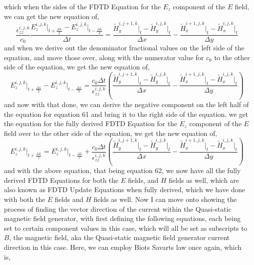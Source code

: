 \documentclass[]{article}
\begin{document}
which when the sides of the FDTD Equation for the $E_z$ component of the $E$ field, we can get the new equation of,
\begin{equation}
\frac{\epsilon_{zz}^{i,j,k}}{c_0} \frac{{E}_{z}^{i,j,k}\Big|_{t+\frac{\Delta{L}}{2}} -E_{z}^{i,j,k}\Big|_{t - \frac{\Delta{L}}{2}}}{\Delta{t}} = \frac{\tilde{H}_{y}^{i, j + 1 , k} \Big|_t - \tilde{H}_{y}^{i,j,k}\Big|_t}{\Delta{x}} - \frac{\tilde{H}_{x}^{i + 1, j, k} \Big|_t - \tilde{H}_{x}^{i,j,k}\Big|_t}{\Delta{y}}
\end{equation}
and when we derive out the denominator fractional values on the left side of the equation, and move those over, along with the numerator value for $c_0$ to the other side of the equation, we get the new equation of,
\begin{equation}
{E}_{z}^{i,j,k}\Big|_{t+\frac{\Delta{L}}{2}} -E_{z}^{i,j,k}\Big|_{t - \frac{\Delta{L}}{2}} = \frac{c_0\Delta{t}}{\epsilon_{zz}^{i,j,k}} \left(\frac{\tilde{H}_{y}^{i, j + 1 , k} \Big|_t - \tilde{H}_{y}^{i,j,k}\Big|_t}{\Delta{x}} - \frac{\tilde{H}_{x}^{i + 1, j, k} \Big|_t - \tilde{H}_{x}^{i,j,k}\Big|_t}{\Delta{y}}\right)
\end{equation}
and now with that done, we can derive the negative component on the left half of the equation for equation 61 and bring it to the right side of the equation, we get the equation for the fully derived FDTD Equation for the $E_z$ component of the $E$ field over to the other side of the equation, we get the new equation of,
\begin{equation}
{E}_{z}^{i,j,k}\Big|_{t+\frac{\Delta{L}}{2}} = E_{z}^{i,j,k}\Big|_{t - \frac{\Delta{L}}{2}} + \frac{c_0\Delta{t}}{\epsilon_{zz}^{i,j,k}} \left(\frac{\tilde{H}_{y}^{i, j + 1 , k} \Big|_t - \tilde{H}_{y}^{i,j,k}\Big|_t}{\Delta{x}} - \frac{\tilde{H}_{x}^{i + 1, j, k} \Big|_t - \tilde{H}_{x}^{i,j,k}\Big|_t}{\Delta{y}}\right)
\end{equation}
and with the above equation, that being equation 62, we now have all the fully derived FDTD Equations for both the $E$ fields, and $H$ fields as well, which are also known as FDTD Update Equations when fully derived, which we have done with both the $E$ fields and $H$ fields as well. Now I can move onto showing the process of finding the vector direction of the current within the Quasi-static magnetic field generator, with first defining the following equations, each being set to certain component values in this case, which will all be set as subscripts to $B$, the magnetic field, aka the Quasi-static magnetic field generator current direction in this case. Here, we can employ Biots Savarts law once again, which is,
\end{document}
